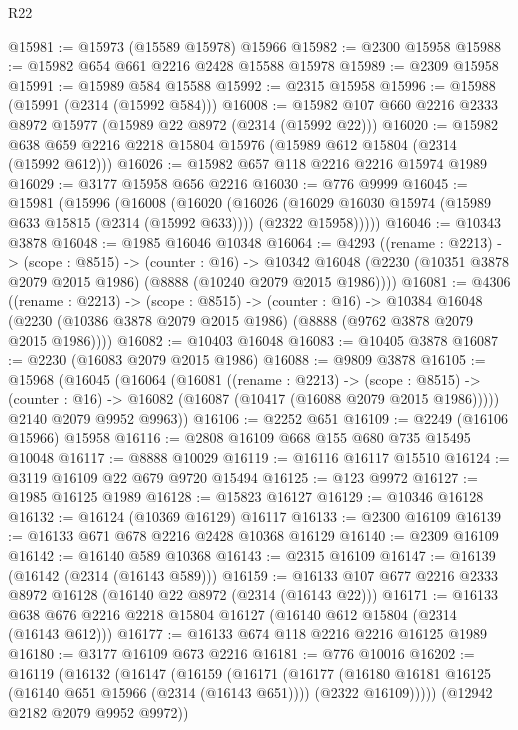 \begin{lexlean}{R22}
\begin{coremodule}
@15981 := @15973 (@15589 @15978) @15966
@15982 := @2300 @15958
@15988 := @15982 @654 @661 @2216 @2428 @15588 @15978
@15989 := @2309 @15958
@15991 := @15989 @584 @15588
@15992 := @2315 @15958
@15996 := @15988 (@15991 (@2314 (@15992 @584)))
@16008 := @15982 @107 @660 @2216 @2333 @8972 @15977 (@15989 @22 @8972 (@2314 (@15992 @22)))
@16020 := @15982 @638 @659 @2216 @2218 @15804 @15976 (@15989 @612 @15804 (@2314 (@15992 @612)))
@16026 := @15982 @657 @118 @2216 @2216 @15974 @1989
@16029 := @3177 @15958 @656 @2216
@16030 := @776 @9999
@16045 := @15981
    (@15996
      (@16008
        (@16020
          (@16026
            (@16029 @16030 @15974 (@15989 @633 @15815 (@2314 (@15992 @633))))
            (@2322 @15958)))))
@16046 := @10343 @3878
@16048 := @1985 @16046 @10348
@16064 := @4293
    ((rename : @2213) ->
    (scope : @8515) ->
    (counter : @16) ->
    @10342 @16048 (@2230 (@10351 @3878 @2079 @2015 @1986) (@8888 (@10240 @2079 @2015 @1986))))
@16081 := @4306
    ((rename : @2213) ->
    (scope : @8515) ->
    (counter : @16) ->
    @10384 @16048 (@2230 (@10386 @3878 @2079 @2015 @1986) (@8888 (@9762 @3878 @2079 @2015 @1986))))
@16082 := @10403 @16048
@16083 := @10405 @3878
@16087 := @2230 (@16083 @2079 @2015 @1986)
@16088 := @9809 @3878
@16105 := @15968
    (@16045
      (@16064
        (@16081
          ((rename : @2213) ->
          (scope : @8515) ->
          (counter : @16) -> @16082 (@16087 (@10417 (@16088 @2079 @2015 @1986)))))
        @2140
        @2079
        @9952
        @9963))
@16106 := @2252 @651
@16109 := @2249 (@16106 @15966) @15958
@16116 := @2808 @16109 @668 @155 @680 @735 @15495 @10048
@16117 := @8888 @10029
@16119 := @16116 @16117 @15510
@16124 := @3119 @16109 @22 @679 @9720 @15494
@16125 := @123 @9972
@16127 := @1985 @16125 @1989
@16128 := @15823 @16127
@16129 := @10346 @16128
@16132 := @16124 (@10369 @16129) @16117
@16133 := @2300 @16109
@16139 := @16133 @671 @678 @2216 @2428 @10368 @16129
@16140 := @2309 @16109
@16142 := @16140 @589 @10368
@16143 := @2315 @16109
@16147 := @16139 (@16142 (@2314 (@16143 @589)))
@16159 := @16133 @107 @677 @2216 @2333 @8972 @16128 (@16140 @22 @8972 (@2314 (@16143 @22)))
@16171 := @16133 @638 @676 @2216 @2218 @15804 @16127 (@16140 @612 @15804 (@2314 (@16143 @612)))
@16177 := @16133 @674 @118 @2216 @2216 @16125 @1989
@16180 := @3177 @16109 @673 @2216
@16181 := @776 @10016
@16202 := @16119
    (@16132
      (@16147
        (@16159
          (@16171
            (@16177
              (@16180 @16181 @16125 (@16140 @651 @15966 (@2314 (@16143 @651))))
              (@2322 @16109)))))
      (@12942 @2182 @2079 @9952 @9972))

\end{coremodule}
\end{lexlean}
